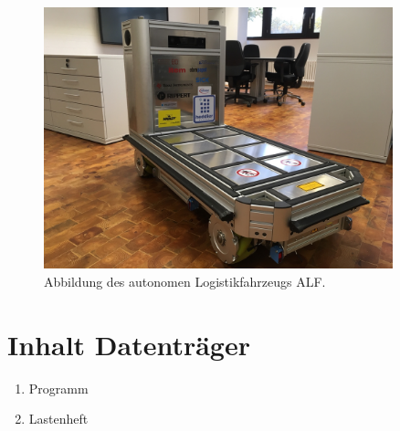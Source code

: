 \documentclass[12pt,a4paper,oneside,numbers=noenddot,headsepline,captions=tableheading,toc=bibliography,openany,tikz,margin=5mm]{scrbook}
\begin{document}
\begin{appendix}
\begin{table}[H]
\begin{center}
\begin{tabular}{|m{}<{\centering}|m{}<{\centering}|}
								
								\hline
							\end{tabular}
						\end{center}
						
						\label{fig: knotenmengen}
					\end{table}
				
				
					\begin{figure}[H]
						\centering
						\includegraphics[angle=90,width=0.9\textwidth]{Bilder/Bild.jpeg}
						\caption{Abbildung des autonomen Logistikfahrzeugs ALF.}
						\label{fig: Wirkstruktur Schlupfregelung}
					\end{figure}
					
				
				
				
					\newpage 
					
				
					
					\section{Inhalt Datenträger} 
					\label{dataCD}
					\begin{enumerate}[label=\textbf{\arabic*},ref=A.1.\arabic*]
						\item Programm
						\label{it: Software}
						\item Lastenheft
						\label{it: Lastenheft}
					\end{enumerate}
				
		
	\end{appendix}
	
	
\end{document}
